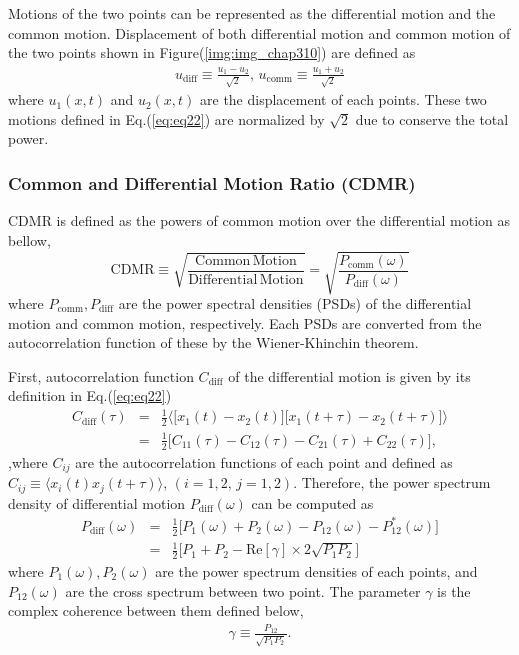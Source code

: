 Motions of the two points can be represented as the differential motion and the common motion. Displacement of both differential motion and common motion of the two points shown in Figure(\ref{img:img_chap310}) are defined as
\begin{eqnarray}\label{eq:eq22}
  u_{\mathrm{diff}} \equiv \frac{u_{1}-u_{2}}{\sqrt{2}}, \,
  u_{\mathrm{comm}}  \equiv \frac{u_{1}+u_{2}}{\sqrt{2}}
\end{eqnarray}
where $u_{1}(x,t)$ and $u_2(x,t)$ are the displacement of each points. These two motions defined in Eq.(\ref{eq:eq22}) are normalized by $\sqrt{2}$ due to conserve the total power.


\subsubsection{Common and Differential Motion Ratio (CDMR)}
CDMR is defined as the powers of common motion over the differential motion as bellow,
\begin{equation}
  \mathrm{CDMR} \equiv \sqrt{\frac{\mathrm{Common\,Motion}}{\mathrm{Differential\,Motion}}} = \sqrt{\frac{P_{\mathrm{comm}}(\omega)}{P_{\mathrm{diff}}(\omega)}} \label{eq:eq23}
\end{equation}
where $P_{\mathrm{comm}},P_{\mathrm{diff}}$ are the power spectral densities (PSDs) of the differential motion and common motion, respectively. Each PSDs are converted from the autocorrelation function of these by the Wiener-Khinchin theorem.

First, autocorrelation function $C_{\mathrm{diff}}$ of the differential motion is given by its definition in Eq.(\ref{eq:eq22})
\begin{eqnarray}
  C_{\mathrm{diff}}(\tau) &=& \frac{1}{2}
  \biggl\langle
  \biggl[ x_{1}(t)-x_{2}(t) \biggr] \biggl[ x_{1}(t+\tau)-x_{2}(t+\tau) \biggr]
  \biggr\rangle \\
  &=& \frac{1}{2}\biggl[ C_{11}(\tau) - C_{12}(\tau) - C_{21}(\tau) + C_{22}(\tau) \biggr], 
\end{eqnarray}
,where $C_{ij}$ are the autocorrelation functions of each point and defined as $ C_{ij} \equiv \langle x_{i}(t)x_{j}(t+\tau)\rangle,\, (i=1,2,\,j=1,2)$. Therefore, the power spectrum density of differential motion $P_{\mathrm{diff}}(\omega)$ can be computed as
\begin{eqnarray}
  P_{\mathrm{diff}}(\omega) &=& \frac{1}{2}\biggl[ P_{1}(\omega) + P_{2}(\omega) - P_{12}(\omega) - P_{12}^*(\omega) \biggr]\\
  &=& \frac{1}{2} \biggl[ P_{1}+P_{2} - \mathrm{Re}\left[\gamma \right]\times2\sqrt{P_{1}P_{2}} \biggr] \label{eq:eq31}
\end{eqnarray}
where $P_{1}(\omega),P_{2}(\omega)$ are the power spectrum densities of each points, and $P_{12}(\omega)$ are the cross spectrum between two point. The parameter $\gamma$ is the complex coherence between them defined below,
\begin{eqnarray}
  \gamma \equiv \frac{P_{12}}{\sqrt{P_{1}P_{2}}}.
\end{eqnarray}

